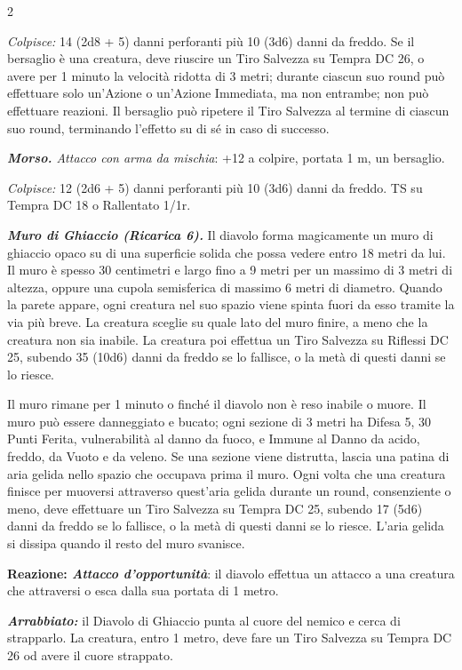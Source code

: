 \begin{multicols}{2}
{\emph{Colpisce:} 14 (2d8 + 5) danni perforanti più 10 (3d6) danni da freddo. Se il bersaglio è una creatura, deve riuscire un Tiro Salvezza su Tempra DC 26, o avere per 1 minuto la velocità ridotta di 3 metri; durante ciascun suo round può effettuare solo un'Azione o un'Azione Immediata, ma non entrambe; non può effettuare reazioni. Il bersaglio può ripetere il Tiro Salvezza al termine di ciascun suo round, terminando l'effetto su di sé in caso di successo.

\emph{\textbf{Morso.} Attacco con arma da mischia}: +12 a colpire, portata 1 m, un bersaglio.

\emph{Colpisce:} 12 (2d6 + 5) danni perforanti più 10 (3d6) danni da freddo. TS su Tempra DC 18 o Rallentato 1/1r.

\emph{\textbf{Muro di Ghiaccio (Ricarica 6).}} Il diavolo forma magicamente un muro di ghiaccio opaco su di una superficie solida che possa vedere entro 18 metri da lui. Il muro è spesso 30 centimetri e largo fino a 9 metri per un massimo di 3 metri di altezza, oppure una cupola semisferica di massimo 6 metri di diametro. Quando la parete appare, ogni creatura nel suo spazio viene spinta fuori da esso tramite la via più breve. La creatura sceglie su quale lato del muro finire, a meno che la creatura non sia inabile. La creatura poi effettua un Tiro Salvezza su Riflessi DC 25, subendo 35 (10d6) danni da freddo se lo fallisce, o la metà di questi danni se lo riesce.

Il muro rimane per 1 minuto o finché il diavolo non è reso inabile o muore. Il muro può essere danneggiato e bucato; ogni sezione di 3 metri ha Difesa 5, 30 Punti Ferita, vulnerabilità al danno da fuoco, e Immune al Danno da acido, freddo, da Vuoto e da veleno. Se una sezione viene distrutta, lascia una patina di aria gelida nello spazio che occupava prima il muro. Ogni volta che una creatura finisce per muoversi attraverso quest'aria gelida durante un round, consenziente o meno, deve effettuare un Tiro Salvezza su Tempra DC 25, subendo 17 (5d6) danni da freddo se lo fallisce, o la metà di questi danni se lo riesce. L'aria gelida si dissipa quando il resto del muro svanisce.

\textbf{Reazione: \emph{Attacco d'opportunità}}: il diavolo effettua un attacco a una creatura che attraversi o esca dalla sua portata di 1 metro.

\emph{\textbf{Arrabbiato:}} il Diavolo di Ghiaccio punta al cuore del nemico e cerca di strapparlo. La creatura, entro 1 metro, deve fare un Tiro Salvezza su Tempra DC 26 od avere il cuore strappato.

}
\end{multicols}

